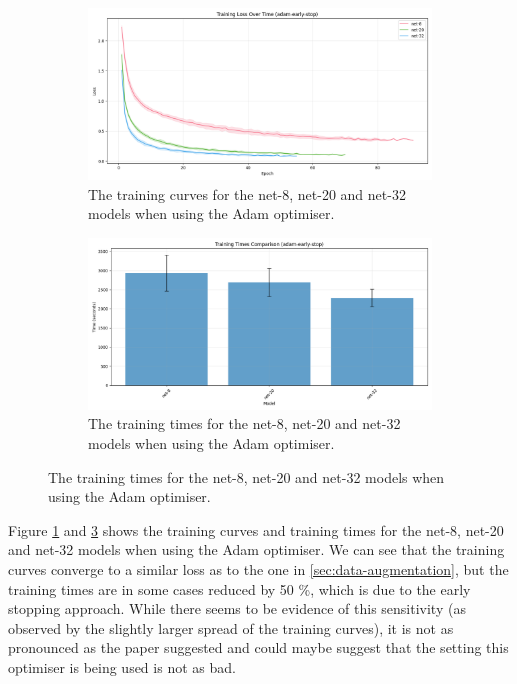 \documentclass[logo,bsc,singlespacing,parskip,online]{infthesis}
\begin{document}
\begin{figure}[h]
   \centering
   \begin{subfigure}[b]{0.48\textwidth}
      \centering
      \includegraphics[width=\textwidth]{adam-early-stop_training_losses.png}
      \caption{The training curves for the net-8, net-20 and net-32 models when using the Adam optimiser.}
      \label{fig:adam-optimiser-losses}
   \end{subfigure}
   \hfill
   \begin{subfigure}[b]{0.48\textwidth}
      \centering
      \includegraphics[width=\textwidth]{adam-early-stop_training_times.png}
      \caption{The training times for the net-8, net-20 and net-32 models when using the Adam optimiser.}
      \label{fig:adam-optimiser-times}
   \end{subfigure}
\end{figure}

Figure \ref{fig:adam-optimiser-losses} and \ref{fig:adam-optimiser-times} shows 
the training curves and training times for the net-8, net-20 and net-32 models
when using the Adam optimiser. We can see that the training curves converge to a 
similar loss as to the one in \ref{sec:data-augmentation}, but the training times 
are in some cases reduced by 50 \%, which is due to the early stopping approach.
While there seems to be evidence of this sensitivity (as observed by the slightly larger spread 
of the training curves), it is not as pronounced as the paper suggested and 
could maybe suggest that the setting this optimiser is being used 
is not as bad. 
\end{document}
